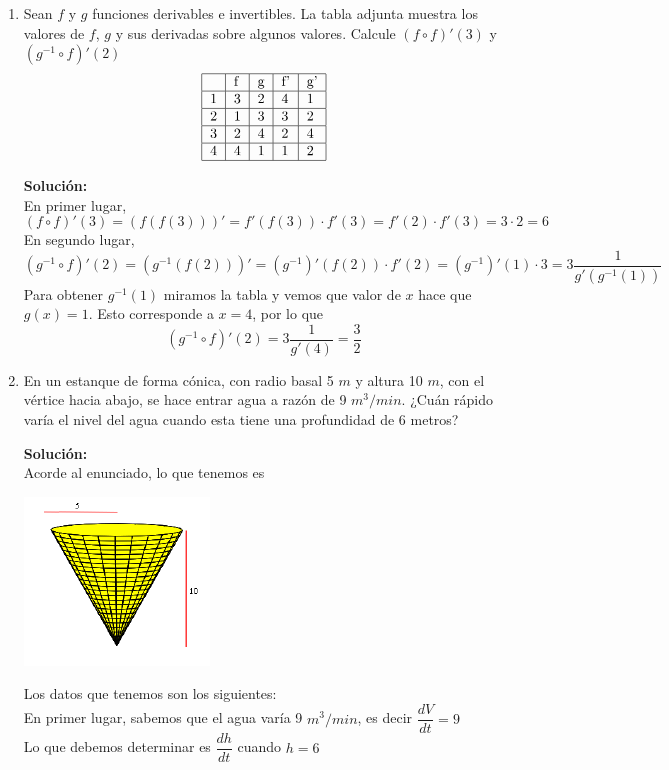 \documentclass[12pt]{article}
\newenvironment{solucion}
{\begin{mdframed}[backgroundcolor=black!10]
		{\bf Solución:}\\
	}
	{
	\end{mdframed}
}
\newenvironment{preguntas}
{\begin{enumerate}\itemsep12pt
	}
	{
	\end{enumerate}
}
\begin{document}
\begin{preguntas}
\begin{solucion}
\end{solucion}
\item Sean $f$ y $g$ funciones derivables e invertibles. La tabla adjunta muestra los valores de $f$, $g$ y sus derivadas sobre algunos valores. Calcule $(f \circ f)'(3)$ y $(g^{-1} \circ f)'(2)$
$$
\begin{tabular}{|l|l|l|l|l|}
\hline
  & f & g & f' & g' \\ \hline
1 & 3 & 2 & 4  & 1  \\ \hline
2 & 1 & 3 & 3  & 2  \\ \hline
3 & 2 & 4 & 2  & 4  \\ \hline
4 & 4 & 1 & 1  & 2  \\ \hline
\end{tabular}
$$
\begin{solucion}
En primer lugar,
$$(f \circ f)'(3) = (f(f(3)))' = f'(f(3))\cdot f'(3) = f'(2) \cdot f'(3) = 3 \cdot 2 = 6$$
En segundo lugar,	
$$(g^{-1} \circ f)'(2) = (g^{-1}(f(2)))' = (g^{-1})'(f(2)) \cdot f'(2) = (g^{-1})'(1)\cdot 3 = 3\dfrac{1}{g'(g^{-1}(1))}$$
Para obtener $g^{-1}(1)$ miramos la tabla y vemos que valor de $x$ hace que $g(x) = 1$. Esto corresponde a $x=4$, por lo que
$$(g^{-1} \circ f)'(2) = 3\dfrac{1}{g'(4)} = \dfrac{3}{2}$$
\end{solucion}
\item En un estanque de forma cónica, con radio basal 5 $m$ y altura 10 $m$, con el vértice hacia abajo, se hace entrar agua a razón de 9 $m^3/min$. ¿Cuán rápido varía el nivel del agua cuando esta tiene una profundidad de 6 metros?
\begin{solucion}
Acorde al enunciado, lo que tenemos es
\begin{center}
\includegraphics[]{cono.png}
\end{center}
Los datos que tenemos son los siguientes:\\
En primer lugar, sabemos que el agua varía 9 $m^3/min$, es decir $\dfrac{dV}{dt} = 9$\\
Lo que debemos determinar es $\dfrac{dh}{dt}$ cuando $h=6$\\

\end{solucion}
\end{preguntas}
\end{document}
